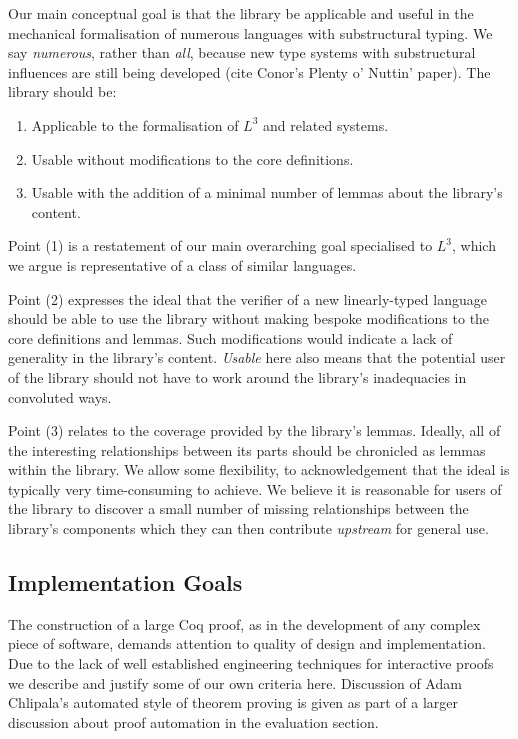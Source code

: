 \documentclass[]{unswthesis}
\let\i\textit
\begin{document}
Our main conceptual goal is that the library be applicable and useful in the mechanical formalisation of numerous languages with substructural typing. We say \i{numerous}, rather than \i{all}, because new type systems with substructural influences are still being developed (cite Conor's Plenty o' Nuttin' paper). The library should be:

\begin{enumerate}
\item Applicable to the formalisation of $L^3$ and related systems.
\item Usable without modifications to the core definitions.
\item Usable with the addition of a minimal number of lemmas about the library's content.
\end{enumerate}

Point (1) is a restatement of our main overarching goal specialised to $L^3$, which we argue is representative of a class of similar languages.

Point (2) expresses the ideal that the verifier of a new linearly-typed language should be able to use the library without making bespoke modifications to the core definitions and lemmas. Such modifications would indicate a lack of generality in the library's content. \i{Usable} here also means that the potential user of the library should not have to work around the library's inadequacies in convoluted ways.

Point (3) relates to the coverage provided by the library's lemmas. Ideally, all of the interesting relationships between its parts should be chronicled as lemmas within the library. We allow some flexibility, to acknowledgement that the ideal is typically very time-consuming to achieve. We believe it is reasonable for users of the library to discover a small number of missing relationships between the library's components which they can then contribute \i{upstream} for general use.

\subsection{Implementation Goals}

The construction of a large Coq proof, as in the development of any complex piece of software, demands attention to quality of design and implementation. Due to the lack of well established engineering techniques for interactive proofs we describe and justify some of our own criteria here. Discussion of Adam Chlipala's automated style of theorem proving is given as part of a larger discussion about proof automation in the evaluation section.
\end{document}
